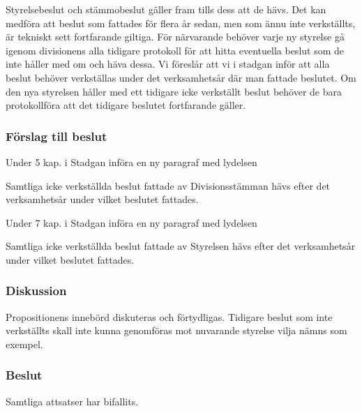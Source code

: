 \documentclass[protokoll]{dvd}
\begin{document}
Styrelsebeslut och stämmobeslut gäller fram tills dess att de hävs.
Det kan medföra att beslut som fattades för flera år sedan, men som ännu inte verkställts, är tekniskt sett fortfarande giltiga.
För närvarande behöver varje ny styrelse gå igenom divisionens alla tidigare protokoll för att hitta eventuella beslut som de inte håller med om och häva dessa.
Vi föreslår att vi i stadgan inför att alla beslut behöver verkställas under det verksamhetsår där man fattade beslutet.
Om den nya styrelsen håller med ett tidigare icke verkställt beslut behöver de bara protokollföra att det tidigare beslutet fortfarande gäller.

\subsubsection*{Förslag till beslut}

\begin{attsatser}
	\item Under 5 kap. i Stadgan införa en ny paragraf med lydelsen

	\begin{displayquote}
		Samtliga icke verkställda beslut fattade av Divisionsstämman hävs efter det verksamhetsår under vilket beslutet fattades.
	\end{displayquote}

	\item Under 7 kap. i Stadgan införa en ny paragraf med lydelsen

	\begin{displayquote}
		Samtliga icke verkställda beslut fattade av Styrelsen hävs efter det verksamhetsår under vilket beslutet fattades.
	\end{displayquote}
\end{attsatser}

\subsubsection{Diskussion}
Propositionens innebörd diskuteras och förtydligas. Tidigare beslut som inte verkställts skall inte kunna genomföras mot nuvarande styrelse vilja nämns som exempel.

\subsubsection{Beslut}
\begin{attsatser}
	\item Samtliga attsatser har bifallits.
\end{attsatser}
\end{document}
